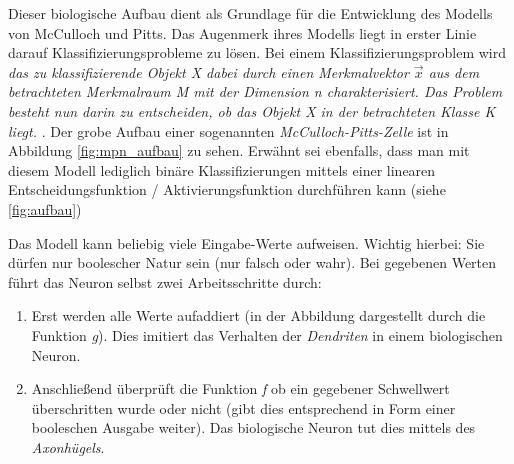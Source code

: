 Dieser biologische Aufbau dient als Grundlage für die Entwicklung des Modells von McCulloch und Pitts. Das Augenmerk ihres Modells liegt in erster Linie darauf Klassifizierungsprobleme zu lösen. Bei einem Klassifizierungsproblem wird \emph{das zu klassifizierende Objekt X dabei durch einen Merkmalvektor $\vec{x}$ aus dem betrachteten Merkmalraum M mit der Dimension n charakterisiert. Das Problem besteht nun darin zu entscheiden, ob das Objekt X in der betrachteten Klasse K liegt.} \cite{klproblem}. Der grobe Aufbau einer sogenannten \emph{McCulloch-Pitts-Zelle} ist in Abbildung \ref{fig:mpn_aufbau} zu sehen. Erwähnt sei ebenfalls, dass man mit diesem Modell lediglich binäre Klassifizierungen mittels einer linearen Entscheidungsfunktion / Aktivierungsfunktion durchführen kann (siehe \autoref{fig:aufbau})

\begin{figure}%
  \centering
  \qquad
  \label{fig:aufbau}
\end{figure}

Das Modell kann beliebig viele Eingabe-Werte aufweisen. Wichtig hierbei: Sie dürfen nur boolescher Natur sein (nur falsch oder wahr). Bei gegebenen Werten führt das Neuron selbst zwei Arbeitsschritte durch: 
\begin{enumerate}

\item Erst werden alle Werte aufaddiert (in der Abbildung dargestellt durch die Funktion \emph{g}). Dies imitiert das Verhalten der \emph{Dendriten} in einem biologischen Neuron. 

\item Anschließend überprüft die Funktion \emph{f} ob ein gegebener Schwellwert überschritten wurde oder nicht (gibt dies entsprechend in Form einer booleschen Ausgabe weiter). Das biologische Neuron tut dies mittels des \emph{Axonhügels}. 

\end{enumerate}

